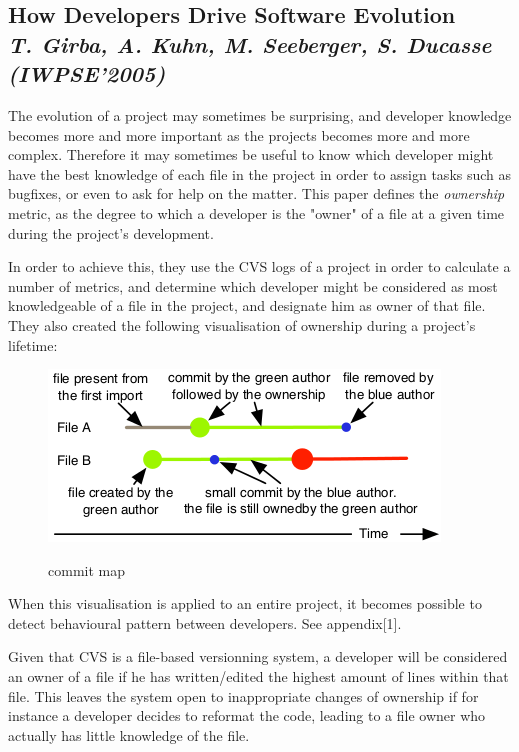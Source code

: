\subsection{How Developers Drive Software Evolution\\ \textit{T. Girba, A. Kuhn, M. Seeberger, S. Ducasse (IWPSE'2005)}}

The evolution of a project may sometimes be surprising, and developer knowledge becomes more and more important as the projects becomes more and more complex. Therefore it may sometimes be useful to know which developer might have the best knowledge of each file in the project in order to assign tasks such as bugfixes, or even to ask for help on the matter.
This paper defines the \emph{ownership} metric, as the degree to which a developer is the "owner" of a file at a given time during the project's development\cite{Girba2005}.

In order to achieve this, they use the CVS logs of a project in order to calculate a number of metrics, and determine which developer might be considered as most knowledgeable of a file in the project, and designate him as owner of that file.
They also created the following visualisation of ownership during a project's lifetime:

\begin{figure}[H]
\includegraphics[keepaspectratio=true,scale=0.5]{./resources/girba2005.png}~
\caption{commit map}
\label{fig:commit_map}
\end{figure}

When this visualisation is applied to an entire project, it becomes possible to detect behavioural pattern between developers. See appendix[1].

Given that CVS is a file-based versionning system, a developer will be considered an owner of a file if he has written/edited the highest amount of lines within that file. This leaves the system open to inappropriate changes of ownership if for instance a developer decides to reformat the code, leading to a file owner who actually has little knowledge of the file.

